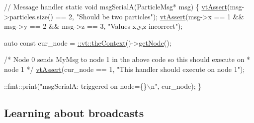 \begin{DoxyCodeInclude}
\textcolor{comment}{// Message handler}
\textcolor{keyword}{static} \textcolor{keywordtype}{void} msgSerialA(ParticleMsg* msg) \{
  \hyperlink{config__assert_8h_aeddd4990a496e91a0ca5d6c16437359b}{vtAssert}(msg->particles.size() == 2, \textcolor{stringliteral}{"Should be two particles"});
  \hyperlink{config__assert_8h_aeddd4990a496e91a0ca5d6c16437359b}{vtAssert}(msg->x == 1 && msg->y == 2 && msg->z == 3, \textcolor{stringliteral}{"Values x,y,z incorrect"});

  \textcolor{keyword}{auto} \textcolor{keyword}{const} cur\_node = \hyperlink{namespacevt_a26551fe0e6e6a1371111df5b12c7e92c}{::vt::theContext}()->\hyperlink{structvt_1_1ctx_1_1_context_a0d52c263ce8516546a67443d9a86fa5f}{getNode}();

  \textcolor{comment}{/* Node 0 sends MyMsg to node 1 in the above code so this should execute on}
\textcolor{comment}{   * node 1 */}
  \hyperlink{config__assert_8h_aeddd4990a496e91a0ca5d6c16437359b}{vtAssert}(cur\_node == 1, \textcolor{stringliteral}{"This handler should execute on node 1"});

  ::fmt::print(\textcolor{stringliteral}{"msgSerialA: triggered on node=\{\}\(\backslash\)n"}, cur\_node);
\}
\end{DoxyCodeInclude}
\hypertarget{tutorial-1d}{}\subsection{Learning about broadcasts}\label{tutorial-1d}

